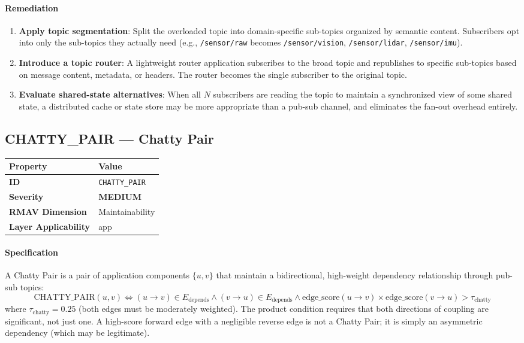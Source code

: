 \documentclass[11pt]{article}
\makeatletter
\newcommand{\MEDIUM}{\textcolor{yellow!50!black}{\textbf{MEDIUM}}}
\newcommand{\patternprop}[4]{%
  \begin{center}
  \begin{tabular}{@{}ll@{}}
  \toprule
  \textbf{Property} & \textbf{Value} \\
  \midrule
  \textbf{ID} & \texttt{#1} \\
  \textbf{Severity} & #2 \\
  \textbf{RMAV Dimension} & #3 \\
  \textbf{Layer Applicability} & #4 \\
  \bottomrule
  \end{tabular}
  \end{center}
}
\makeatother
\begin{document}
\paragraph{Remediation}
\begin{enumerate}[leftmargin=*]
\item \textbf{Apply topic segmentation}: Split the overloaded topic into domain-specific sub-topics organized by semantic content. Subscribers opt into only the sub-topics they actually need (e.g., \texttt{/sensor/raw} becomes \texttt{/sensor/vision}, \texttt{/sensor/lidar}, \texttt{/sensor/imu}).
\item \textbf{Introduce a topic router}: A lightweight router application subscribes to the broad topic and republishes to specific sub-topics based on message content, metadata, or headers. The router becomes the single subscriber to the original topic.
\item \textbf{Evaluate shared-state alternatives}: When all $N$ subscribers are reading the topic to maintain a synchronized view of some shared state, a distributed cache or state store may be more appropriate than a pub-sub channel, and eliminates the fan-out overhead entirely.
\end{enumerate}

\subsection{CHATTY\_PAIR --- Chatty Pair}
\patternprop{CHATTY\_PAIR}{\MEDIUM}{Maintainability}{app}

\paragraph{Specification}
A Chatty Pair is a pair of application components $\{u,v\}$ that maintain a bidirectional, high-weight dependency relationship through pub-sub topics:
\[
\mathrm{CHATTY\_PAIR}(u,v) \Leftrightarrow (u \to v) \in E_{\text{depends}} \land (v \to u) \in E_{\text{depends}} \land \mathrm{edge\_score}(u{\to}v) \times \mathrm{edge\_score}(v{\to}u) > \tau_{\text{chatty}}
\]
where $\tau_{\text{chatty}} = 0.25$ (both edges must be moderately weighted). The product condition requires that both directions of coupling are significant, not just one. A high-score forward edge with a negligible reverse edge is not a Chatty Pair; it is simply an asymmetric dependency (which may be legitimate).
\end{document}
